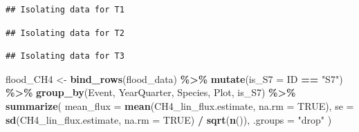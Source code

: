 \documentclass[
]{article}
\newenvironment{Shaded}{\begin{snugshade}}{\end{snugshade}}
\newcommand{\AttributeTok}[1]{\textcolor[rgb]{0.13,0.29,0.53}{#1}}
\newcommand{\ConstantTok}[1]{\textcolor[rgb]{0.56,0.35,0.01}{#1}}
\newcommand{\ControlFlowTok}[1]{\textcolor[rgb]{0.13,0.29,0.53}{\textbf{#1}}}
\newcommand{\FunctionTok}[1]{\textcolor[rgb]{0.13,0.29,0.53}{\textbf{#1}}}
\newcommand{\NormalTok}[1]{#1}
\newcommand{\OtherTok}[1]{\textcolor[rgb]{0.56,0.35,0.01}{#1}}
\newcommand{\SpecialCharTok}[1]{\textcolor[rgb]{0.81,0.36,0.00}{\textbf{#1}}}
\newcommand{\StringTok}[1]{\textcolor[rgb]{0.31,0.60,0.02}{#1}}
\begin{document}
\begin{Shaded}
\end{Shaded}

\begin{verbatim}
## Isolating data for T1
\end{verbatim}

\begin{verbatim}
## Isolating data for T2
\end{verbatim}

\begin{verbatim}
## Isolating data for T3
\end{verbatim}

\begin{Shaded}
\begin{Highlighting}[]
\NormalTok{flood\_CH4 }\OtherTok{\textless{}{-}} \FunctionTok{bind\_rows}\NormalTok{(flood\_data) }\SpecialCharTok{\%\textgreater{}\%}
  \FunctionTok{mutate}\NormalTok{(}\AttributeTok{is\_S7 =}\NormalTok{ ID }\SpecialCharTok{==} \StringTok{"S7"}\NormalTok{) }\SpecialCharTok{\%\textgreater{}\%}
  \FunctionTok{group\_by}\NormalTok{(Event, YearQuarter, Species, Plot, is\_S7) }\SpecialCharTok{\%\textgreater{}\%}
  \FunctionTok{summarize}\NormalTok{(}
    \AttributeTok{mean\_flux =} \FunctionTok{mean}\NormalTok{(CH4\_lin\_flux.estimate, }\AttributeTok{na.rm =} \ConstantTok{TRUE}\NormalTok{),}
    \AttributeTok{se =} \FunctionTok{sd}\NormalTok{(CH4\_lin\_flux.estimate, }\AttributeTok{na.rm =} \ConstantTok{TRUE}\NormalTok{) }\SpecialCharTok{/} \FunctionTok{sqrt}\NormalTok{(}\FunctionTok{n}\NormalTok{()),}
    \AttributeTok{.groups =} \StringTok{"drop"}\NormalTok{ )}
\end{Highlighting}
\end{Shaded}
\end{document}
